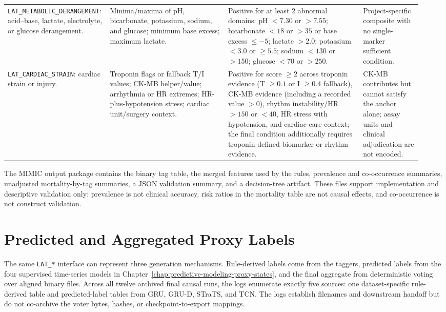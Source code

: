 \begin{landscape}
\begin{longtable}{@{}L{0.19\linewidth}L{0.29\linewidth}L{0.32\linewidth}L{0.14\linewidth}@{}}
\nolinkurl{LAT_METABOLIC_DERANGEMENT}: acid--base, lactate, electrolyte, or glucose derangement. & Minima/maxima of pH, bicarbonate, potassium, sodium, and glucose; minimum base excess; maximum lactate. & Positive for at least 2 abnormal domains: pH $<7.30$ or $>7.55$; bicarbonate $<18$ or $>35$ or base excess $\le -5$; lactate $>2.0$; potassium $<3.0$ or $\ge 5.5$; sodium $<130$ or $>150$; glucose $<70$ or $>250$. & Project-specific composite with no single-marker sufficient condition. \\
\nolinkurl{LAT_CARDIAC_STRAIN}: cardiac strain or injury. & Troponin flags or fallback T/I values; CK-MB helper/value; arrhythmia or HR extremes; HR-plus-hypotension stress; cardiac unit/surgery context. & Positive for score $\ge 2$ across troponin evidence (T $\ge 0.1$ or I $\ge 0.4$ fallback), CK-MB evidence (including a recorded value $>0$), rhythm instability/HR $>150$ or $<40$, HR stress with hypotension, and cardiac-care context; the final condition additionally requires troponin-defined biomarker or rhythm evidence. & CK-MB contributes but cannot satisfy the anchor alone; assay units and clinical adjudication are not encoded. \\
\end{longtable}
\endgroup
\end{landscape}

The MIMIC output package contains the binary tag table, the merged features used by the rules, prevalence and co-occurrence summaries, unadjusted mortality-by-tag summaries, a JSON validation summary, and a decision-tree artifact.  These files support implementation and descriptive validation only: prevalence is not clinical accuracy, risk ratios in the mortality table are not causal effects, and co-occurrence is not construct validation.

\section{Predicted and Aggregated Proxy Labels}
\label{sec:clinical-proxy-state-construction:predicted-majority-vote-proxy-states}

The same \texttt{LAT\_*} interface can represent three generation mechanisms.  Rule-derived labels come from the taggers, predicted labels from the four supervised time-series models in Chapter~\ref{chap:predictive-modeling-proxy-states}, and the final aggregate from deterministic voting over aligned binary files.  Across all twelve archived final causal runs, the logs enumerate exactly five sources: one dataset-specific rule-derived table and predicted-label tables from GRU, GRU-D, STraTS, and TCN.  The logs establish filenames and downstream handoff but do not co-archive the voter bytes, hashes, or checkpoint-to-export mappings.

